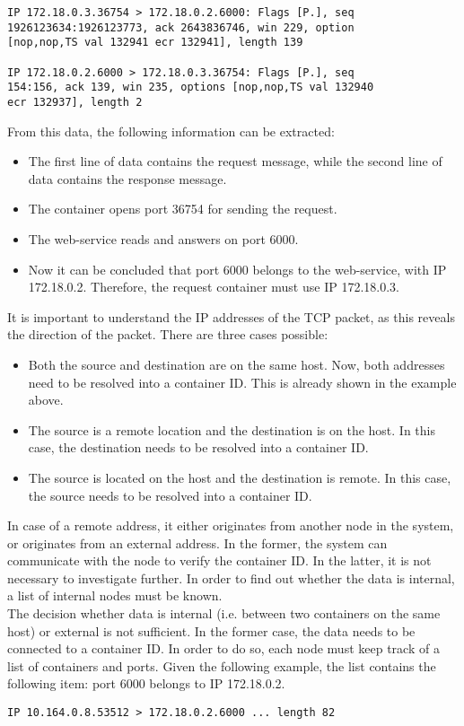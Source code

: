 \begin{verbatim}
IP 172.18.0.3.36754 > 172.18.0.2.6000: Flags [P.], seq
1926123634:1926123773, ack 2643836746, win 229, option
[nop,nop,TS val 132941 ecr 132941], length 139

IP 172.18.0.2.6000 > 172.18.0.3.36754: Flags [P.], seq
154:156, ack 139, win 235, options [nop,nop,TS val 132940 
ecr 132937], length 2
\end{verbatim}
From this data, the following information can be extracted:
\begin{itemize}
    \item The first line of data contains the request message, while the second line of data contains the response message.    
    \item The container opens port 36754 for sending the request.
    \item The web-service reads and answers on port 6000.
    \item Now it can be concluded that port 6000 belongs to the web-service, with IP 172.18.0.2. Therefore, the request container must use IP 172.18.0.3.
\end{itemize}
It is important to understand the IP addresses of the TCP packet, as this reveals the direction of the packet. There are three cases possible:
\begin{itemize}
    \item Both the source and destination are on the same host. Now, both addresses need to be resolved into a container ID. This is already shown in the example above.
    \item The source is a remote location and the destination is on the host. In this case, the destination needs to be resolved into a container ID.
    \item The source is located on the host and the destination is remote. In this case, the source needs to be resolved into a container ID.
\end{itemize}

\noindent
In case of a remote address, it either originates from another node in the system, or originates from an external address. In the former, the system can communicate with the node to verify the container ID. In the latter, it is not necessary to investigate further. In order to find out whether the data is internal, a list of internal nodes must be known.\\

\noindent
The decision whether data is internal (i.e. between two containers on the same host) or external is not sufficient. In the former case, the data needs to be connected to a container ID. In order to do so, each node must keep track of a list of containers and ports. Given the following example, the list contains the following item: port 6000 belongs to IP 172.18.0.2.
\begin{verbatim}
IP 10.164.0.8.53512 > 172.18.0.2.6000 ... length 82
\end{verbatim}


